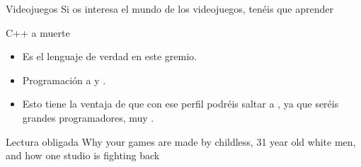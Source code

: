 \documentclass[14pt]{beamer}
\newcommand{\WebLink}[2]{
  \href{#1}{\structure{\PointingHand~\color{sail-green}{#2}}}
}
\begin{document}
\begin{frame}{Videojuegos}
  \centering \small
  Si os interesa el mundo de los videojuegos, tenéis que aprender

  \begin{alertblock}{}
    \centering \LARGE C++ a muerte
  \end{alertblock}

  \begin{itemize} \small
    \itemsep0em
    \item Es el lenguaje de verdad en este gremio.
    \item Programación a  y .
    \item Esto tiene la ventaja de que con ese perfil podréis saltar
      a , ya que seréis grandes
      programadores, muy .
  \end{itemize}

  \begin{block}{\centering \small Lectura obligada}
    \centering \small Why your games are made by childless, 31 year
    old white men, and how one studio is fighting back
    \WebLink{https://web.archive.org/web/20131211193933/http://penny-arcade.com/report/article/why-your-games-are-made-by-childless-31-year-old-white-men-and-how-one-stud}
            {Internet Archive}
  \end{block}
\end{frame}
\end{document}
